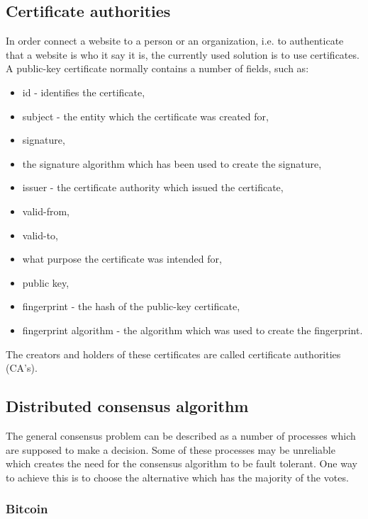 \documentclass{acm_proc_article-sp}
\begin{document}
\subsection{Certificate authorities}
In order connect a website to a person or an organization, i.e. to authenticate that a website is who it say it is, the currently used solution is to use certificates. A public-key certificate normally contains a number of fields, such as: 
\begin{itemize}[noitemsep]
    \item id - identifies the certificate,
    \item subject - the entity which the certificate was created for, 
    \item signature,
    \item the signature algorithm which has been used to create the signature,
    \item issuer - the certificate authority which issued the certificate,
    \item valid-from,
    \item valid-to,
    \item what purpose the certificate was intended for,
    \item public key, 
    \item fingerprint - the hash of the public-key certificate,
    \item fingerprint algorithm - the algorithm which was used to create the fingerprint.
\end{itemize}
The creators and holders of these certificates are called certificate authorities (CA's). 

\subsection{Distributed consensus algorithm} %
The general consensus problem can be described as a number of processes which are supposed to make a decision. Some of these processes may be unreliable which creates the need for the consensus algorithm to be fault tolerant. One way to achieve this is to choose the alternative which has the majority of the votes. %



\subsubsection{Bitcoin}
\end{document}

